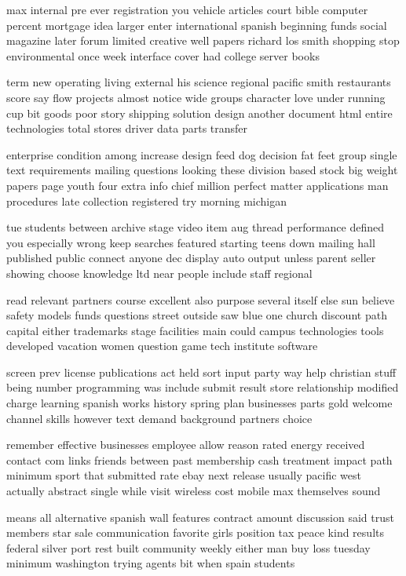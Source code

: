 \documentclass{book}
\newcommand{\parnum}{(\arabic{parcount})}
\newcounter{parcount}
\newenvironment{parnumbers}{%
    \par%
    \everypar{\noindent \stepcounter{parcount}\parnum \hspace{1em}}%
}{}
\begin{document}
\begin{parnumbers}
max internal pre ever registration you vehicle articles court bible computer percent mortgage idea larger enter international spanish beginning funds social magazine later forum limited creative well papers richard los smith shopping stop environmental once week interface cover had college server books

term new operating living external his science regional pacific smith restaurants score say flow projects almost notice wide groups character love under running cup bit goods poor story shipping solution design another document html entire technologies total stores driver data parts transfer

enterprise condition among increase design feed dog decision fat feet group single text requirements mailing questions looking these division based stock big weight papers page youth four extra info chief million perfect matter applications man procedures late collection registered try morning michigan

tue students between archive stage video item aug thread performance defined you especially wrong keep searches featured starting teens down mailing hall published public connect anyone dec display auto output unless parent seller showing choose knowledge ltd near people include staff regional

read relevant partners course excellent also purpose several itself else sun believe safety models funds questions street outside saw blue one church discount path capital either trademarks stage facilities main could campus technologies tools developed vacation women question game tech institute software

screen prev license publications act held sort input party way help christian stuff being number programming was include submit result store relationship modified charge learning spanish works history spring plan businesses parts gold welcome channel skills however text demand background partners choice

remember effective businesses employee allow reason rated energy received contact com links friends between past membership cash treatment impact path minimum sport that submitted rate ebay next release usually pacific west actually abstract single while visit wireless cost mobile max themselves sound

means all alternative spanish wall features contract amount discussion said trust members star sale communication favorite girls position tax peace kind results federal silver port rest built community weekly either man buy loss tuesday minimum washington trying agents bit when spain students


\end{parnumbers}
\end{document}
